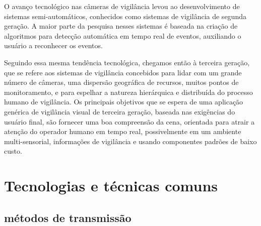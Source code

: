 \documentclass[12pt, %
openright, 
oneside, %
a4paper,    %
brazil]{facom-ufu-abntex2}
\begin{document}
O avanço tecnológico nas câmeras de vigilância levou ao desenvolvimento de
sistemas semi-automáticos, conhecidos como sistemas de vigilância de segunda
geração. A maior parte da pesquisa nesses sistemas é baseada na criação de
algoritmos para detecção automática em tempo real de eventos, auxiliando o
usuário a reconhecer os eventos.

Seguindo essa mesma tendência tecnológica, chegamos então à terceira geração,
que se refere aos sistemas de vigilância concebidos para lidar com um grande
número de câmeras, uma dispersão geográfica de recursos, muitos pontos de
monitoramento, e para espelhar a natureza hierárquica e distribuída do processo
humano de vigilância. Os principais objetivos que se espera de uma aplicação
genérica de vigilância visual de terceira geração, baseada nas exigências do
usuário final, são fornecer uma boa compreensão da cena, orientada para atrair
a atenção do operador humano em tempo real, possivelmente em um ambiente
multi-sensorial, informações de vigilância e usando componentes padrões de
baixo custo.

\section{Tecnologias e técnicas comuns}

\subsection{métodos de transmissão}
\end{document}
